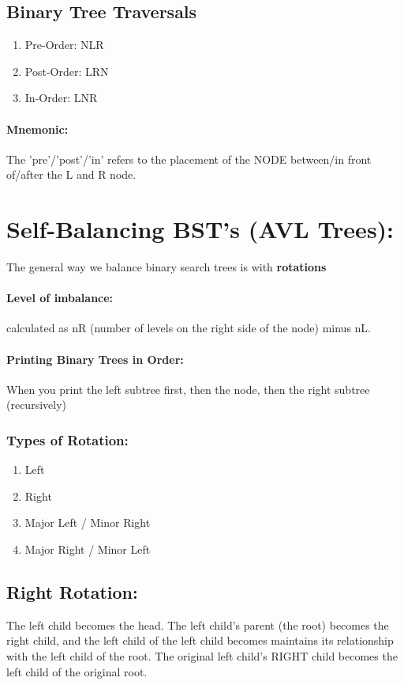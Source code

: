 \documentclass[a4paper,12pt]{report}
\begin{document}
\subsection{Binary Tree Traversals}
\begin{enumerate}
\item Pre-Order: NLR
\item Post-Order: LRN
\item In-Order: LNR
\end{enumerate}
\paragraph{Mnemonic: } The 'pre'/'post'/'in' refers to the placement of the NODE between/in front of/after the L and R node.

\section{Self-Balancing BST's (AVL Trees): }
The general way we balance binary search trees is with \textbf{rotations}
\paragraph{Level of imbalance: } calculated as nR (number of levels on the right side of the node) minus nL.
\paragraph{Printing Binary Trees in Order: } When you print the left subtree first, then the node, then the right subtree (recursively)
\subsubsection{Types of Rotation: }
\begin{enumerate}
\item Left
\item Right
\item Major Left / Minor Right
\item Major Right / Minor Left
\end{enumerate}

\subsection{Right Rotation: }
The left child becomes the head. The left child's parent (the root) becomes the right child, and the left child of the left child becomes maintains its relationship with the left child of the root. The original left child's RIGHT child becomes the left child of the original root. 
\end{document}
